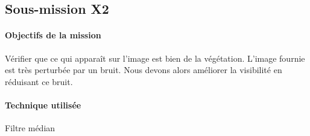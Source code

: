 \subsection{Sous-mission X2}

	\begin{vwcol}[widths={0.65,0.2}, rule=0pt]
	\begin{minipage}{0.7\textwidth}
	\paragraph{Objectifs de la mission}

	Vérifier que ce qui apparaît sur l'image est bien de la végétation. L'image fournie est très perturbée par un bruit. Nous devons alors améliorer la visibilité en réduisant ce bruit.
	\end{minipage}

	\begin{minipage}{0.25\textwidth}
	\begin{flushright}
	\paragraph{Technique utilisée}
	
	Filtre médian
	\end{flushright}
	\end{minipage}

	\end{vwcol} 

